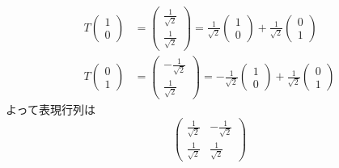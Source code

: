 \begin{ans}
\begin{align*}
T\begin{pmatrix}1 \\ 0\end{pmatrix} &= \begin{pmatrix}\frac{1}{\sqrt{2}} \\ \frac{1}{\sqrt{2}}\end{pmatrix} = \frac{1}{\sqrt{2}}\begin{pmatrix}1 \\ 0\end{pmatrix} + \frac{1}{\sqrt{2}}\begin{pmatrix}0 \\ 1\end{pmatrix}\\
T\begin{pmatrix}0 \\ 1\end{pmatrix} &= \begin{pmatrix}-\frac{1}{\sqrt{2}} \\ \frac{1}{\sqrt{2}}\end{pmatrix} = -\frac{1}{\sqrt{2}}\begin{pmatrix}1 \\ 0\end{pmatrix} + \frac{1}{\sqrt{2}}\begin{pmatrix}0 \\ 1\end{pmatrix}
\end{align*}
よって表現行列は
\[\begin{pmatrix}\frac{1}{\sqrt{2}} & -\frac{1}{\sqrt{2}} \\ \frac{1}{\sqrt{2}} & \frac{1}{\sqrt{2}}\end{pmatrix}\]
\end{ans}

